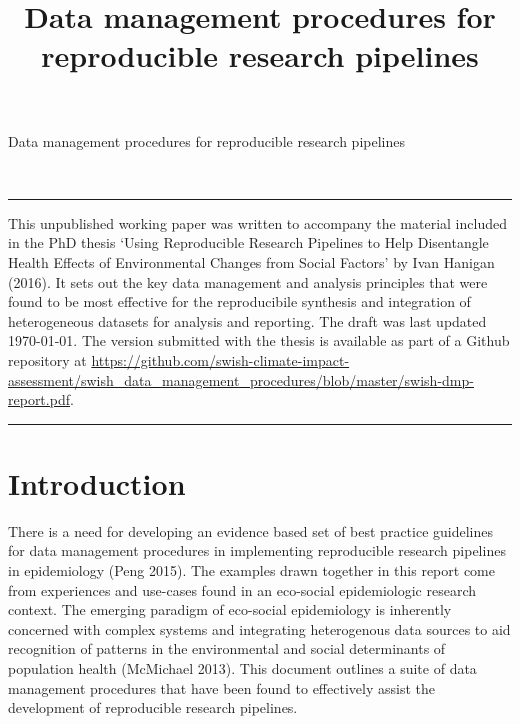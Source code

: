 \documentclass[11pt,a4paper]{article}
\title{Data management procedures for reproducible research pipelines}
\author{
}
\date{}
\renewenvironment{abstract}{
  \hfill\begin{minipage}{1\textwidth}
  \rule{\textwidth}{1pt}\vspace{5pt}
  \normalsize
  \begin{justify}
  \bfseries\abstractname\vspace{5pt}
  \end{justify}}
  {\par\noindent\rule{\textwidth}{1pt}\end{minipage}
}
\begin{document}
\begin{singlespace}
\begin{center}
\huge Data management procedures for reproducible research pipelines
\end{center}
\begin{center}
\large
\end{center}
\begin{justify}
\footnotesize \emph{ 
}
\setcounter{num}{1}
\\[0.1cm]
\footnotesize \emph{ 
}
\end{justify}
\normalsize

\begin{abstract}
This unpublished working paper was written to accompany the material
included in the PhD thesis `Using Reproducible Research Pipelines to
Help Disentangle Health Effects of Environmental Changes from Social
Factors' by Ivan Hanigan (2016). It sets out the key data management and
analysis principles that were found to be most effective for the
reproducibile synthesis and integration of heterogeneous datasets for
analysis and reporting. The draft was last updated \today. The version
submitted with the thesis is available as part of a Github repository at
\href{https://github.com/swish-climate-impact-assessment/swish_data_management_procedures/blob/master/swish-dmp-report.pdf}{\url{https://github.com/swish-climate-impact-assessment/swish_data_management_procedures/blob/master/swish-dmp-report.pdf}}.
\end{abstract}
\end{singlespace}

{
\hypersetup{linkcolor=black}
\setcounter{tocdepth}{2}
\tableofcontents
}

\clearpage
\doublespace

\section{Introduction}\label{introduction}

There is a need for developing an evidence based set of best practice
guidelines for data management procedures in implementing reproducible
research pipelines in epidemiology (Peng 2015). The examples drawn
together in this report come from experiences and use-cases found in an
eco-social epidemiologic research context. The emerging paradigm of
eco-social epidemiology is inherently concerned with complex systems and
integrating heterogenous data sources to aid recognition of patterns in
the environmental and social determinants of population health
(McMichael 2013). This document outlines a suite of data management
procedures that have been found to effectively assist the development of
reproducible research pipelines.
\end{document}
